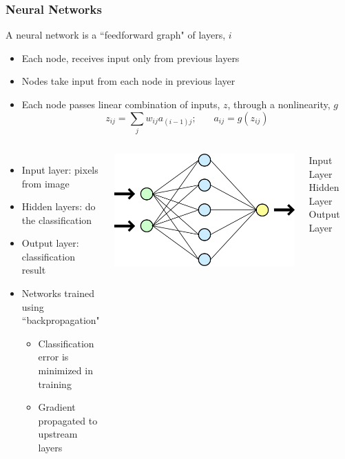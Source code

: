 \documentclass[10pt,professionalfonts,xcolor=table]{beamer}
\begin{document}
\begin{frame}
\frametitle{Neural Networks}

\begin{itemize}
\bang A neural network is a ``feedforward graph" of layers, $i$
  \begin{itemize}
  \item Each node,  receives input only from previous layers
  \item Nodes take input from each node in previous layer
  \item Each node passes linear combination of inputs, $z$, through a nonlinearity, $g$
  \bong \[ z_{ij} = \sum_j w_{ij} a_{(i-1)j}; ~~~~~~~~ a_{ij}  = g(z_{ij}) \]
  \end{itemize}
\end{itemize}
\vspace{20pt}
\begin{columns}[c]

  \begin{itemize}
  \item Input layer: pixels from image
  \item Hidden layers: do the classification
  \item Output layer: classification result
  \gap
  \item Networks trained using ``backpropagation"
    \begin{itemize}
    \item Classification error is minimized in training
    \item Gradient propagated to upstream layers
    \end{itemize}
  \end{itemize}
\centering
\includegraphics[width=1\textwidth]{figures/figures/basicNN.png}
\begin{columns}[c]
\centering \footnotesize
Input Layer
\centering \footnotesize
Hidden Layer
\centering \footnotesize
Output Layer
\end{columns}
\end{columns}


\end{frame}
\end{document}
